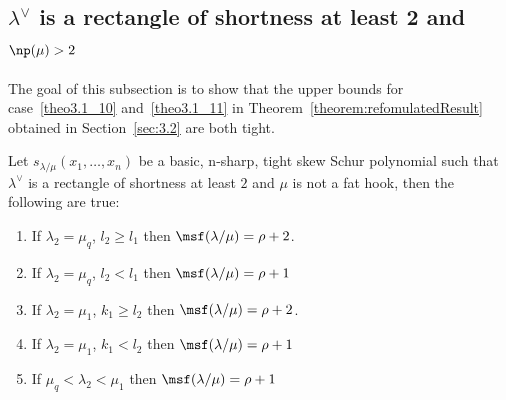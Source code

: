 \subsection{\texorpdfstring{$\lambda^\vee$}{lambda vee} is a rectangle of shortness at least 2 and \texorpdfstring{$\np (\mu) > 2$}{np(mu) > 2}}

The goal of this subsection is to show that the upper bounds for case~\ref{theo3.1_10} and~\ref{theo3.1_11} in Theorem~\ref{theorem:refomulatedResult} obtained in Section~\ref{sec:3.2} are both tight. 

\begin{theorem}
\label{thm:necessarynotfathook}
Let $s_{\lambda/\mu}(x_1,\ldots,x_n)$ be a basic, n-sharp, tight skew Schur polynomial such that $\lambda^\vee$ is a rectangle of shortness at least $2$ and $\mu$ is not a fat hook, then the following are true:
\begin{enumerate}[label=(\Roman*)]
 \item\label{theo4.9_1} If $\lambda_2 = \mu_q$, $l_2\geq l_1$ then $\msf (\lambda/\mu) = \rho+2$.
 \item\label{theo4.9_2} If $\lambda_2 = \mu_q$, $l_2< l_1$ then $\msf (\lambda/\mu) = \rho+1$
 \item\label{theo4.9_3} If $\lambda_2 = \mu_1$, $k_1\geq l_2$ then $\msf (\lambda/\mu) = \rho+2$.
 \item\label{theo4.9_4} If $\lambda_2 = \mu_1$, $k_1< l_2$ then $\msf (\lambda/\mu) = \rho+1$
 \item\label{theo4.9_5} If $\mu_q<\lambda_2<\mu_1$ then $\msf (\lambda/\mu) = \rho+1$
\end{enumerate}
\end{theorem}

